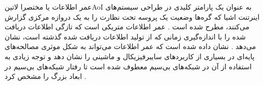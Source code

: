 
عمر اطلاعات یا مختصرا ‌لاتین{AoI} به عنوان یک پارامتر کلیدی
در طراحی سیستم‌های اینرتنت اشیا که گره‌ها وضعیت یک پروسه تحت نظارت را به یک دروازه مرکزی گزارش می‌کنند،
مطرح شده است
.
عمر اطلاعات متریکی است که تازگی اطلاعات دریافت شده را با اندازه‌گیری زمانی که از تولید اطلاعات دریافت شده گذشته است، نشان می‌دهد
.
نشان داده شده است که عمر اطلاعات می‌تواند به شکل موثری مصالحه‌های پایه‌ای در بسیاری از کاربردهای سایبرفیزیکال و ماشینی را نشان دهد
و توجه زیادی به استفاده از آن در شبکه‌های بی‌سیم معطوف شده است تا رفتار شبکه‌های بی‌سیم در ابعاد بزرگ را مشخص کرد
.
